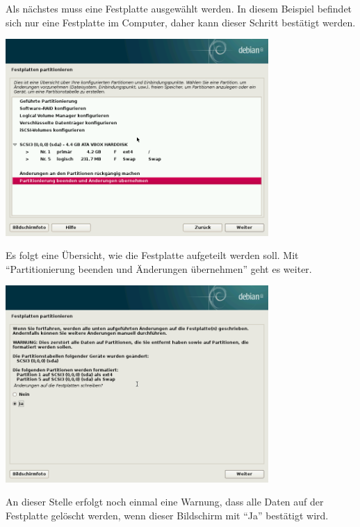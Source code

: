 \documentclass[a4paper,12pt,twoside]{article}
\begin{document}
Als nächstes muss eine Festplatte ausgewählt werden. In diesem Beispiel
befindet sich nur eine Festplatte im Computer, daher kann dieser
Schritt bestätigt werden.

\begin{minipage}{\linewidth}
    \centering
    \captionsetup{type=figure}
    \includegraphics[width=10cm]{screenshots/accept_partitioning.png}
    \label{fig:best_partitionierung}
\end{minipage}

Es folgt eine Übersicht, wie die Festplatte aufgeteilt werden soll. Mit
"`Partitionierung beenden und Änderungen übernehmen"' geht es weiter.

\begin{minipage}{\linewidth}
    \centering
    \captionsetup{type=figure}
    \includegraphics[width=10cm]{screenshots/confirm_partitioning.png}
    \label{fig:abfrage_partitionierung}
\end{minipage}

An dieser Stelle erfolgt noch einmal eine Warnung, dass alle Daten auf
der Festplatte gelöscht werden, wenn dieser Bildschirm mit
"`Ja"' bestätigt wird.
\end{document}

